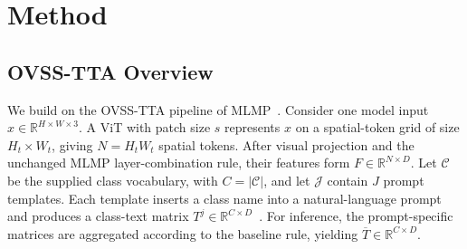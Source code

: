 \documentclass[letterpaper]{article}
\newcommand{\method}{TRACE\xspace}
\begin{document}
	
	
	
	
	
	
	
	\section{Method}
	
	\subsection{OVSS-TTA Overview}
	\label{sec:ovss-tta-overview}
	
	We build on the OVSS-TTA pipeline of MLMP~\cite{noori2025mlmp}. Consider one model input $x\in\mathbb{R}^{H\times W\times3}$. A ViT with patch size $s$ represents $x$ on a spatial-token grid of size $H_t\times W_t$, giving $N=H_tW_t$ spatial tokens. After visual projection and the unchanged MLMP layer-combination rule, their features form $F\in\mathbb{R}^{N\times D}$. Let $\mathcal C$ be the supplied class vocabulary, with $C=|\mathcal C|$, and let $\mathcal J$ contain $J$ prompt templates. Each template inserts a class name into a natural-language prompt and produces a class-text matrix $T^j\in\mathbb{R}^{C\times D}$~\cite{radford2021clip}. For inference, the prompt-specific matrices are aggregated according to the baseline rule, yielding $\overline T\in\mathbb{R}^{C\times D}$.
	
\end{document}
